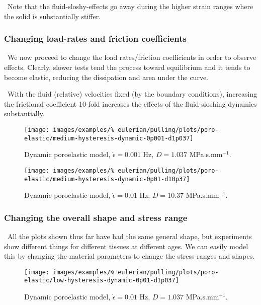 \textbullet\ Note that the fluid-sloshy-effects go away during the
higher strain ranges where the solid is substantially stiffer.

\subsubsection{Changing load-rates and friction coefficients}
\label{load-rates-and-friction-coefficients}

\textbullet\ We now proceed to change the load rates/friction
coefficients in order to observe effects. Clearly, slower tests tend
the process toward equilibrium and it tends to become elastic,
reducing the dissipation and area under the curve.

\textbullet\ With the fluid (relative) velocities fixed (by the
boundary conditions), increasing
the frictional coefficient 10-fold increases the effects of the
fluid-sloshing dynamics substantially.

\begin{figure}[!hptb]
\centering
\texttt{[image: images/examples/\%
eulerian/pulling/plots/poro-elastic/medium-hysteresis-dynamic-0p001-d1p037]}
\caption{Dynamic poroelastic model, $\dot{\epsilon}=0.001$ Hz, $D=1.037$
  MPa.s.mm$^{-1}$.}
\label{medium-hysteresis-dynamic-0p001-d1p037}
\end{figure}

\begin{figure}[!hptb]
\centering
\texttt{[image: images/examples/\%
eulerian/pulling/plots/poro-elastic/medium-hysteresis-dynamic-0p01-d10p37]}
\caption{Dynamic poroelastic model, $\dot{\epsilon}=0.01$ Hz, $D=10.37$
  MPa.s.mm$^{-1}$.}
\label{medium-hysteresis-dynamic-0p01-d10p37}
\end{figure}

\subsubsection{Changing the overall shape and stress range}
\label{changing-shape}

\textbullet\ All the plots shown thus far have had the same general
shape, but experiments show different things for different tissues at
different ages. We can easily model this by changing the material
parameters to change the stress-ranges and shapes.

\begin{figure}[!hptb]
\centering
\texttt{[image: images/examples/\%
eulerian/pulling/plots/poro-elastic/low-hysteresis-dynamic-0p01-d1p037]}
\caption{Dynamic poroelastic model, $\dot{\epsilon}=0.01$ Hz, $D=1.037$
  MPa.s.mm$^{-1}$.}
\label{low-hysteresis-dynamic-0p01-d1p037}
\end{figure}

